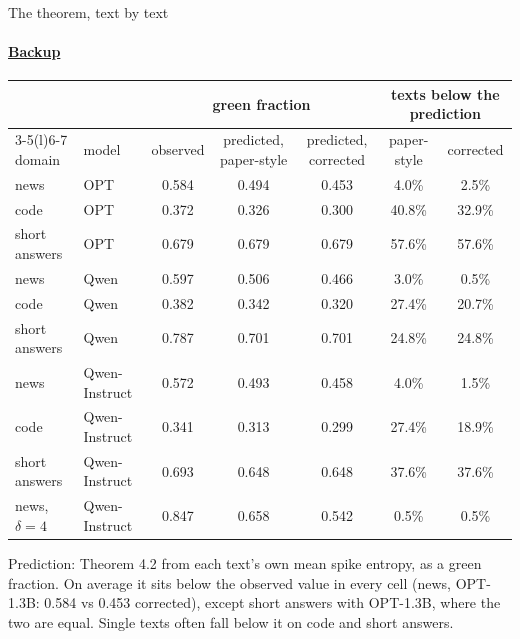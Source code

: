 \documentclass[aspectratio=169,10pt,t]{beamer}
\begin{document}
\begin{frame}[label=b15]{The theorem, text by text}
  \framesubtitle{\hyperlink{b0}{Backup}}
  \scriptsize
  \begin{center}
  \begin{tabular}{@{}llccccc@{}}
    \toprule
     & & \multicolumn{3}{c}{green fraction} & \multicolumn{2}{c}{texts below the prediction} \\
    \cmidrule(lr){3-5}\cmidrule(l){6-7}
    domain & model & observed & predicted, paper-style & predicted, corrected & paper-style & corrected \\
    \midrule
    news & OPT & 0.584 & 0.494 & 0.453 & 4.0\% & 2.5\% \\
    code & OPT & 0.372 & 0.326 & 0.300 & 40.8\% & 32.9\% \\
    short answers & OPT & 0.679 & 0.679 & 0.679 & 57.6\% & 57.6\% \\
    news & Qwen & 0.597 & 0.506 & 0.466 & 3.0\% & 0.5\% \\
    code & Qwen & 0.382 & 0.342 & 0.320 & 27.4\% & 20.7\% \\
    short answers & Qwen & 0.787 & 0.701 & 0.701 & 24.8\% & 24.8\% \\
    news & Qwen-Instruct & 0.572 & 0.493 & 0.458 & 4.0\% & 1.5\% \\
    code & Qwen-Instruct & 0.341 & 0.313 & 0.299 & 27.4\% & 18.9\% \\
    short answers & Qwen-Instruct & 0.693 & 0.648 & 0.648 & 37.6\% & 37.6\% \\
    news, $\delta = 4$ & Qwen-Instruct & 0.847 & 0.658 & 0.542 & 0.5\% & 0.5\% \\
    \bottomrule
  \end{tabular}
  \end{center}
  \vspace{0.3em}
  \small
  Prediction: Theorem 4.2 from each text's own mean spike entropy, as a green fraction. On average it sits below the observed value in every cell (news, OPT-1.3B: 0.584 vs 0.453 corrected), except short answers with OPT-1.3B, where the two are equal. Single texts often fall below it on code and short answers.
\end{frame}
\end{document}
